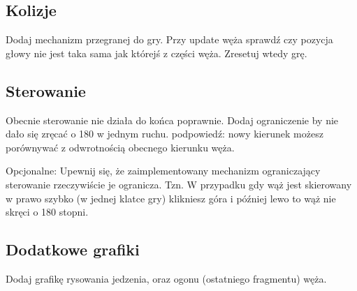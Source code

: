\documentclass[12pt]{article}
\begin{document}
\subsection{Kolizje}

Dodaj mechanizm przegranej do gry.
Przy update węża sprawdź czy pozycja głowy nie jest taka sama jak którejś z części węża. Zresetuj wtedy grę.

\subsection{Sterowanie}
Obecnie sterowanie nie działa do końca poprawnie. Dodaj ograniczenie by nie dało się zręcać o 180 w jednym ruchu. podpowiedź: nowy kierunek możesz porównywać z odwrotnością obecnego kierunku węża.

Opcjonalne: Upewnij się, że zaimplementowany mechanizm ograniczający sterowanie rzeczywiście je ogranicza. Tzn. W przypadku gdy wąż jest skierowany w prawo szybko (w jednej klatce gry) klikniesz góra i później lewo to wąż nie skręci o 180 stopni.

\subsection{Dodatkowe grafiki}

Dodaj grafikę rysowania jedzenia, oraz ogonu (ostatniego fragmentu) węża.
    	
\end{document}
